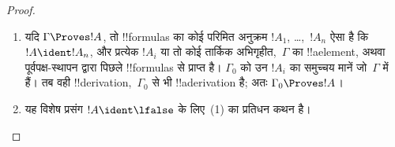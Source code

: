 \documentclass[../../../include/open-logic-section]{subfiles}
\begin{document}
\begin{proof}
  \begin{enumerate}
    \item यदि $\Gamma \Proves !A$, तो !!{formula}s का कोई परिमित अनुक्रम
      $!A_1$, \dots,~$!A_n$ ऐसा है कि $!A \ident !A_n$, और प्रत्येक
      $!A_i$ या तो कोई तार्किक अभिगृहीत,~$\Gamma$ का !!a{element}, अथवा
      पूर्वपक्ष-स्थापन द्वारा पिछले !!{formula}s से प्राप्त है। $\Gamma_0$
      को उन $!A_i$ का समुच्चय मानें जो~$\Gamma$ में हैं। तब वही
      !!{derivation},~$\Gamma_0$ से भी !!a{derivation} है; अतः
      $\Gamma_0 \Proves !A$।
    \item यह विशेष प्रसंग $!A
      \ident \lfalse$ के लिए~(1) का प्रतिधन कथन
      है।
\end{enumerate}
\end{proof}
\end{document}

